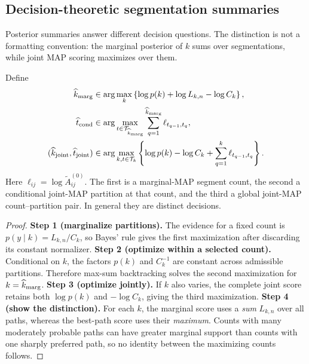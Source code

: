 \subsection{Decision-theoretic segmentation summaries}
\label{sec:decision-rules}
Posterior summaries answer different decision questions. The distinction is not a formatting convention: the marginal posterior of $k$ sums over segmentations, while joint MAP scoring maximizes over them.

\begin{proposition}
\label{prop:three-modes}
Define
\begin{align*}
\widehat k_{\rm marg}&\in\arg\max_k\left\{\log p(k)+\log L_{k,n}-\log C_k\right\},\\
\widehat t_{\rm cond}&\in\arg\max_{t\in\mathcal T_{\widehat k_{\rm marg}}}
 \sum_{q=1}^{\widehat k_{\rm marg}}\ell_{t_{q-1},t_q},\\
(\widehat k_{\rm joint},\widehat t_{\rm joint})&\in\arg\max_{k,t\in\mathcal T_k}
\left\{\log p(k)-\log C_k+\sum_{q=1}^{k}\ell_{t_{q-1},t_q}\right\}.
\end{align*}
Here $\ell_{ij}=\log\widetilde A^{(0)}_{ij}$. The first is a marginal-MAP segment count, the second a conditional joint-MAP partition at that count, and the third a global joint-MAP count--partition pair. In general they are distinct decisions.
\end{proposition}
\begin{proof}
\textbf{Step 1 (marginalize partitions).} The evidence for a fixed count is $p(y\mid k)=L_{k,n}/C_k$, so Bayes' rule gives the first maximization after discarding its constant normalizer.
\textbf{Step 2 (optimize within a selected count).} Conditional on $k$, the factors $p(k)$ and $C_k^{-1}$ are constant across admissible partitions. Therefore max-sum backtracking solves the second maximization for $k=\widehat k_{\rm marg}$.
\textbf{Step 3 (optimize jointly).} If $k$ also varies, the complete joint score retains both $\log p(k)$ and $-\log C_k$, giving the third maximization.
\textbf{Step 4 (show the distinction).} For each $k$, the marginal score uses a \emph{sum} $L_{k,n}$ over all paths, whereas the best-path score uses their \emph{maximum}. Counts with many moderately probable paths can have greater marginal support than counts with one sharply preferred path, so no identity between the maximizing counts follows.
\end{proof}

